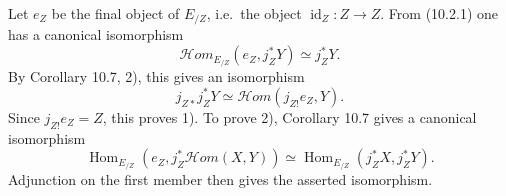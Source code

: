 \documentclass[11pt]{article}
\newcommand{\Hom}{\operatorname{Hom}}
\newcommand{\id}{\operatorname{id}}
\newcommand{\scrHom}{\mathscr{H}\!om}
\newcommand{\ie}{i.e.}
\begin{document}
Let $e_Z$ be the final object of $E_{/Z}$, \ie\ the object $\id_Z:Z\to Z$. From (10.2.1) one has a canonical isomorphism
\[
\scrHom_{E_{/Z}}(e_Z,j_Z^*Y)\simeq j_Z^*Y.
\]
By Corollary 10.7, 2), this gives an isomorphism
\[
j_{Z*}j_Z^*Y\simeq \scrHom(j_{Z!}e_Z,Y).
\]
Since $j_{Z!}e_Z=Z$, this proves 1). To prove 2), Corollary 10.7 gives a canonical isomorphism
\[
\Hom_{E_{/Z}}(e_Z,j_Z^*\scrHom(X,Y))\simeq
\Hom_{E_{/Z}}(j_Z^*X,j_Z^*Y).
\]
Adjunction on the first member then gives the asserted isomorphism.
\end{document}
